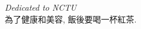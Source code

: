 \begin{dedication}
\begin{center}
  \textit{Dedicated to NCTU}\\
  {\Large 為了健康和美容, 飯後要喝一杯紅茶.}\\
\end{center}
\end{dedication}

